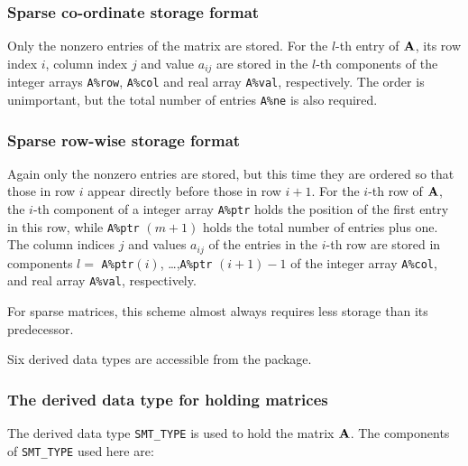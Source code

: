 \documentclass{galahad}
\begin{document}
\subsubsection{Sparse co-ordinate storage format}\label{coordinate}
Only the nonzero entries of the matrix are stored. For the 
$l$-th entry of ${\mathbf{A}}$, its row index $i$, column index $j$ 
and value $a_{ij}$
are stored in the $l$-th components of the integer arrays {\tt A\%row}, 
{\tt A\%col} and real array {\tt A\%val}, respectively.
The order is unimportant, but the total
number of entries {\tt A\%ne} is also required. 

\subsubsection{Sparse row-wise storage format}\label{rowwise}
Again only the nonzero entries are stored, but this time
they are ordered so that those in row $i$ appear directly before those
in row $i+1$. For the $i$-th row of ${\mathbf{A}}$, the $i$-th component of a 
integer array {\tt A\%ptr} holds the position of the first entry in this row,
while {\tt A\%ptr} $(m+1)$ holds the total number of entries plus one.
The column indices $j$ and values $a_{ij}$ of the entries in the $i$-th row 
are stored in components 
$l =$ {\tt A\%ptr}$(i)$, \ldots ,{\tt A\%ptr} $(i+1)-1$ of the 
integer array {\tt A\%col}, and real array {\tt A\%val}, respectively. 

For sparse matrices, this scheme almost always requires less storage than 
its predecessor.








\galtypes
Six derived data types are accessible from the package.


\subsubsection{The derived data type for holding matrices}\label{typesmt}
The derived data type {\tt SMT\_TYPE} is used to hold the matrix ${\mathbf{A}}$.
The components of {\tt SMT\_TYPE} used here are:
\end{document}
